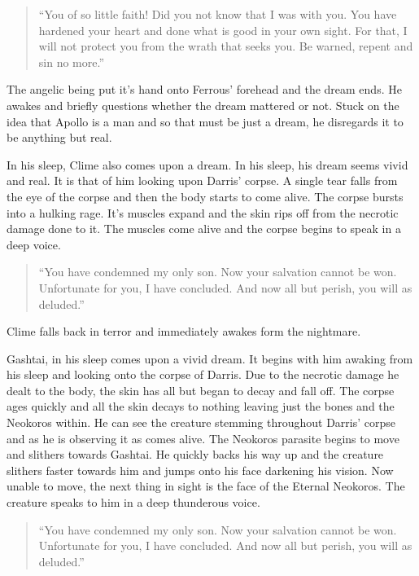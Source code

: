 \begin{quote}
	``You of so little faith! Did you not know that I was with you. You have hardened your heart and done what is good in your own sight. For that, I will not protect you from the wrath that seeks you. Be warned, repent and sin no more.''
\end{quote} 

The angelic being put it's hand onto Ferrous' forehead and the dream ends. He awakes and briefly questions whether the dream mattered or not. Stuck on the idea that Apollo is a man and so that must be just a dream, he disregards it to be anything but real.

In his sleep, Clime also comes upon a dream. In his sleep, his dream seems vivid and real. It is that of him looking upon Darris' corpse. A single tear falls from the eye of the corpse and then the body starts to come alive. The corpse bursts into a hulking rage. It's muscles expand and the skin rips off from the necrotic damage done to it. The muscles come alive and the corpse begins to speak in a deep voice.

\begin{quote}
	``You have condemned my only son. Now your salvation cannot be won. Unfortunate for you, I have concluded. And now all but perish, you will as deluded.''
\end{quote}

Clime falls back in terror and immediately awakes form the nightmare.

Gashtai, in his sleep comes upon a vivid dream. It begins with him awaking from his sleep and looking onto the corpse of Darris. Due to the necrotic damage he dealt to the body, the skin has all but began to decay and fall off. The corpse ages quickly and all the skin decays to nothing leaving just the bones and the Neokoros within. He can see the creature stemming throughout Darris' corpse and as he is observing it as comes alive. The Neokoros parasite begins to move and slithers towards Gashtai. He quickly backs his way up and the creature slithers faster towards him and jumps onto his face darkening his vision. Now unable to move, the next thing in sight is the face of the Eternal Neokoros. The creature speaks to him in a deep thunderous voice.

\begin{quote}
	``You have condemned my only son. Now your salvation cannot be won. Unfortunate for you, I have concluded. And now all but perish, you will as deluded.''
\end{quote}

